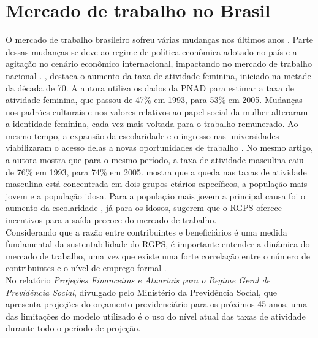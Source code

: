 \documentclass[12pt, 						%
			openright, 					%
			twoside,					%
			a4paper,x					%
			english,					%
			brazil]{abntex2}				%
\begin{document}
	\section{Mercado de trabalho no Brasil \label{sec1.3}}
	\begin{OnehalfSpace}
	O mercado de trabalho brasileiro sofreu várias mudanças nos últimos anos \cite{alves2008transiccao}. Parte dessas mudanças se deve ao regime de política econômica adotado no país e a agitação no cenário econômico internacional, impactando no mercado de trabalho nacional \cite{chahad2013mercado}. , destaca o aumento da taxa de atividade feminina, iniciado na metade da década de 70. A autora utiliza os dados da PNAD para estimar a taxa de atividade feminina, que passou de 47\% em 1993, para 53\% em 2005. Mudanças nos padrões culturais e nos valores relativos ao papel social da mulher alteraram a identidade feminina, cada vez mais voltada para o trabalho remunerado. Ao mesmo tempo, a expansão da escolaridade e o ingresso nas universidades viabilizaram o acesso delas a novas oportunidades de trabalho \cite{bruschini2007trabalho}. No mesmo artigo, a autora mostra que para o mesmo período, a taxa de atividade masculina caiu de 76\% em 1993, para 74\% em 2005.  mostra que a queda nas taxas de atividade masculina está concentrada em dois grupos etários específicos, a população mais jovem e a população idosa. Para a população mais jovem a principal causa foi o aumento da escolaridade \cite{chahad2013mercado}, já para os idosos,  sugerem que o RGPS oferece incentivos para a saída precoce do mercado de trabalho.\\
	Considerando que a razão entre contribuintes e beneficiários é uma medida fundamental da sustentabilidade do RGPS, é importante entender a dinâmica do mercado de trabalho, uma vez que existe uma forte correlação entre o número de contribuintes e o nível de emprego formal \cite{projeccao}. \\
	No relatório \textit{Projeções Financeiras e Atuariais para o Regime Geral de Previdência Social}, divulgado pelo Ministério da Previdência Social, que apresenta projeções do orçamento previdenciário para os próximos 45 anos, uma das limitações do modelo utilizado é o uso do nível atual das taxas de atividade  durante todo o período de projeção.
	\end{OnehalfSpace}
\end{document}
